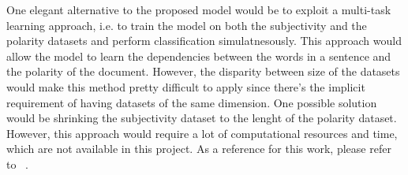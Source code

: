 One elegant alternative to the proposed model would be to exploit a multi-task learning approach, i.e. to train the model on both the subjectivity and the polarity datasets 
and perform classification simulatnesously. This approach would allow the model to learn the dependencies between the words in a sentence and the polarity of the document.
However, the disparity between size of the datasets would make this method pretty difficult to apply since there's the implicit requirement of having datasets of the same
dimension. One possible solution would be shrinking the subjectivity dataset to the lenght of the polarity dataset. However, this approach would require a lot of 
computational resources and time, which are not available in this project. As a reference for this work, please refer to ~\cite{mtl}.\\
